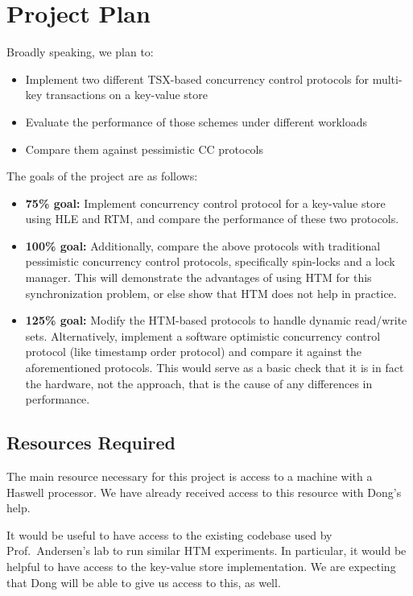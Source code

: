 \section{Project Plan} \label{sec:plan}

Broadly speaking, we plan to:
\begin{itemize}
\item Implement two different TSX-based concurrency control protocols for
  multi-key transactions on a key-value store
\item Evaluate the performance of those schemes under different workloads
\item Compare them against pessimistic CC protocols
\end{itemize}
The goals of the project are as follows:
\begin{itemize}
\item \textbf{75\% goal:} Implement concurrency control protocol for a key-value
        store using HLE and RTM, and compare the performance of these two
        protocols.
\item \textbf{100\% goal:} Additionally, compare the above protocols with
        traditional pessimistic concurrency control protocols, specifically
        spin-locks and a lock manager. This will demonstrate the advantages of
        using HTM for this synchronization problem, or else show that 
        HTM does not help in practice.
\item \textbf{125\% goal:} Modify the HTM-based protocols to handle dynamic
        read/write sets. Alternatively, implement a software optimistic concurrency
        control protocol (like timestamp order protocol) and compare it against the
        aforementioned protocols. This would serve as a basic check that it is in
        fact the hardware, not the approach, that is the cause of any differences in
        performance.
\end{itemize}

\subsection{Resources Required}
The main resource necessary for this project is access to a machine
with a Haswell processor. We have already received access to this
resource with Dong's help.

It would be useful to have access to the existing codebase used by Prof.\ Andersen's lab to run similar HTM experiments. In particular, it would be helpful to have access to the key-value store implementation. We are expecting that Dong will be able to give us access to this, as well.


